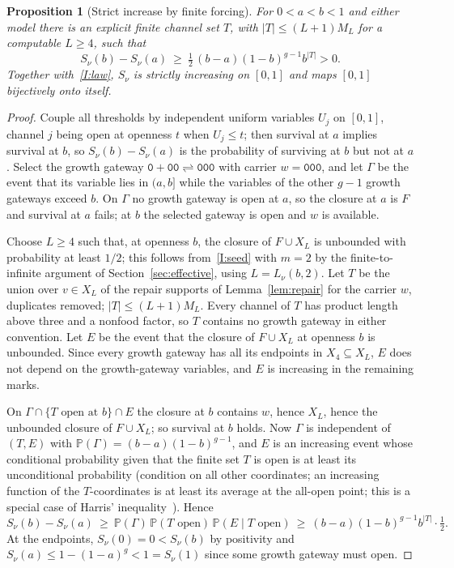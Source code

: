 \documentclass[11pt,a4paper]{article}
\theoremstyle{plain}
\newtheorem{proposition}[theorem]{Proposition}
\theoremstyle{definition}
\theoremstyle{remark}
\newcommand{\conventional}{\par\nopagebreak{\small\raggedright\textup{Conventional proof; not formalised.}\par}}
\newcommand{\Prob}{\mathbb{P}}
\newcommand{\word}[1]{\mathtt{#1}}
\begin{document}
\begin{proposition}[Strict increase by finite forcing]\label{prop:strict}
For $0<a<b<1$ and either model there is an explicit finite channel set $T$, with $|T|\le(L+1)M_L$ for a computable $L\ge4$, such that
\begin{equation}\label{eq:strict}
S_\nu(b)-S_\nu(a)\ \ge\ \tfrac12\,(b-a)(1-b)^{g-1}b^{|T|}>0 .
\end{equation}
Together with~\ref{I:law}, $S_\nu$ is strictly increasing on $[0,1]$ and maps $[0,1]$ bijectively onto itself.
\end{proposition}
\begin{proof}
Couple all thresholds by independent uniform variables $U_j$ on $[0,1]$, channel $j$ being open at openness $t$ when $U_j\le t$; then survival at $a$ implies survival at $b$, so $S_\nu(b)-S_\nu(a)$ is the probability of surviving at $b$ but not at $a$. Select the growth gateway $\word0+\word{00}\rightleftharpoons\word{000}$ with carrier $w=\word{000}$, and let $\Gamma$ be the event that its variable lies in $(a,b]$ while the variables of the other $g-1$ growth gateways exceed $b$. On $\Gamma$ no growth gateway is open at $a$, so the closure at $a$ is $F$ and survival at $a$ fails; at $b$ the selected gateway is open and $w$ is available.

Choose $L\ge4$ such that, at openness $b$, the closure of $F\cup X_L$ is unbounded with probability at least $1/2$; this follows from~\ref{I:seed} with $m=2$ by the finite-to-infinite argument of Section~\ref{sec:effective}, using $L=L_\nu(b,2)$. Let $T$ be the union over $v\in X_L$ of the repair supports of Lemma~\ref{lem:repair} for the carrier $w$, duplicates removed; $|T|\le(L+1)M_L$. Every channel of $T$ has product length above three and a nonfood factor, so $T$ contains no growth gateway in either convention. Let $E$ be the event that the closure of $F\cup X_L$ at openness $b$ is unbounded. Since every growth gateway has all its endpoints in $X_4\subseteq X_L$, $E$ does not depend on the growth-gateway variables, and $E$ is increasing in the remaining marks.

On $\Gamma\cap\{T\text{ open at }b\}\cap E$ the closure at $b$ contains $w$, hence $X_L$, hence the unbounded closure of $F\cup X_L$; so survival at $b$ holds. Now $\Gamma$ is independent of $(T,E)$ with $\Prob(\Gamma)=(b-a)(1-b)^{g-1}$, and $E$ is an increasing event whose conditional probability given that the finite set $T$ is open is at least its unconditional probability (condition on all other coordinates; an increasing function of the $T$-coordinates is at least its average at the all-open point; this is a special case of Harris' inequality~\cite{harris1960lower,grimmett1999percolation}). Hence
\[
S_\nu(b)-S_\nu(a)\ \ge\ \Prob(\Gamma)\,\Prob(T\text{ open})\,\Prob(E\mid T\text{ open})\ \ge\ (b-a)(1-b)^{g-1}b^{|T|}\cdot\tfrac12 .
\]
At the endpoints, $S_\nu(0)=0<S_\nu(b)$ by positivity and $S_\nu(a)\le1-(1-a)^{g}<1=S_\nu(1)$ since some growth gateway must open.
\end{proof}
\conventional
\end{document}
